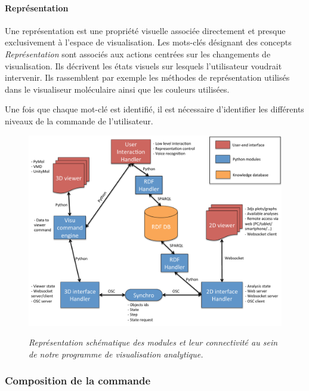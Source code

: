 \paragraph{Représentation}

Une représentation est une propriété visuelle associée directement et presque exclusivement à l'espace de visualisation. Les mots-clés désignant des concepts \textit{Représentation} sont associés aux actions centrées sur les changements de visualisation. Ils décrivent les états visuels sur lesquels l'utilisateur voudrait intervenir. Ils rassemblent par exemple les méthodes de représentation utilisés dans le visualiseur moléculaire ainsi que les couleurs utilisées.

Une fois que chaque mot-clé est identifié, il est nécessaire d'identifier les différents niveaux de la commande de l'utilisateur.

\begin{figure}
  \centering
  {\includegraphics[width=.75\linewidth]{./figures/ch4_visu_ana_semantic_schema.pdf}}
    \caption{{\it Représentation schématique des modules et leur connectivité au sein de notre programme de visualisation analytique.}}
  \label{Fig:schema_prog_visu_ana}
  \hspace{0.3cm}
\end{figure}

\subsubsection{Composition de la commande}

